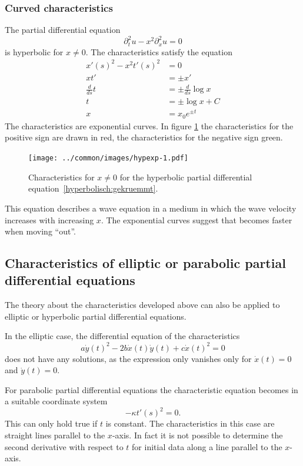 \subsubsection{Curved characteristics}
The partial differential equation
\begin{equation}
\partial_t^2u-x^2\partial_x^2u=0
\label{hyperbolisch:gekruemmt}
\end{equation}
is hyperbolic for $x\ne 0$.
The characteristics satisfy the equation
\begin{align*}
x'(s)^2-x^2t'(s)^2&=0
\\
xt'&=\pm  x'
\\
\frac{d}{ds}t&=\pm\frac{d}{ds}\log x
\\
t&=\pm\log x+C
\\
x&=x_0e^{\pm t}
\end{align*}
The characteristics are exponential curves.
In figure \ref{hyp:exp}
the characteristics for the positive sign are drawn in red,
the characteristics for the negative sign green.
\begin{figure}
\begin{center}
\texttt{[image: ../common/images/hypexp-1.pdf]}
\end{center}
\caption{Characteristics for $x\ne 0$ for the hyperbolic partial
differential equation~\eqref{hyperbolisch:gekruemmt}.
\label{hyp:exp}}
\end{figure}

This equation describes a wave equation in a medium in which
the wave velocity increases with increasing $x$.
The exponential curves suggest that becomes faster when moving ``out''.

\subsection{Characteristics of elliptic or parabolic partial differential
equations}
The theory about the characteristics developed above can also be
applied to elliptic or hyperbolic partial differential equations.

In the elliptic case, the differential equation of the characteristics
\[
a\dot y(t)^2-2b\dot x(t)\dot y(t)+c\dot x(t)^2=0
\]
does not have any solutions, as the expression only vanishes only for
$\dot x(t)=0$ and $\dot y(t)=0$.

For parabolic partial differential equations the characteristic
equation becomes in a suitable coordinate system
\[
-\kappa t'(s)^2=0.
\]
This can only hold true if $t$ is constant.
The characteristics in this case are straight lines parallel
to the $x$-axis.
In fact it is not possible to determine the second derivative
with respect to $t$ for initial data along a line parallel
to the $x$-axis.

